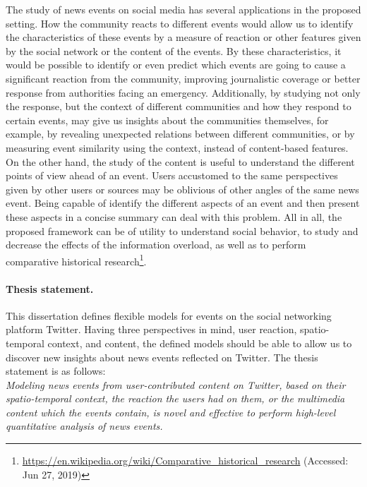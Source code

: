 \documentclass[runningheads]{llncs}
\begin{document}
The study of news events on social media has several applications in the
proposed setting. 
%
How the community reacts to different events would allow us to identify the
characteristics of these events by a measure of reaction or other features given
by the social network or the content of the events. 
%
By these characteristics, it would be possible to identify or even predict which
events are going to cause a significant reaction from the community, improving
journalistic coverage or better response from authorities facing an emergency.
%
Additionally, by studying not only the response, but the context of different
communities and how they respond to certain events, may give us insights about
the communities themselves, for example, by revealing unexpected relations
between different communities, or by measuring event similarity using the
context, instead of content-based features. 
%
On the other hand, the study of the content is useful to understand the
different points of view ahead of an event. 
%
Users accustomed to the same perspectives given by other users or sources may be
oblivious of other angles of the same news event. 
%
Being capable of identify the different aspects of an event and then present
these aspects in a concise summary can deal with this problem. 
%
All in all, the proposed framework can be of utility to understand social
behavior, to study and decrease the effects of the information overload, as well
as to perform comparative historical
research\footnote{\url{https://en.wikipedia.org/wiki/Comparative\_historical\_research}
(Accessed: Jun 27, 2019)}.


\paragraph{Thesis statement.} 
%
This dissertation defines flexible models for events on the social
networking platform Twitter. 
%
Having three perspectives in mind, user reaction, spatio-temporal context, and
content, the defined models should be able to allow us to discover new insights
about news events reflected on Twitter. 
%
The thesis statement is as follows: \\

{\em
Modeling news events from user-contributed content on Twitter, based on
their spatio-temporal context, the reaction the users had on them, or the
multimedia content which the events contain, is novel and effective to perform
high-level quantitative analysis of news events. \\
%
}
\end{document}
